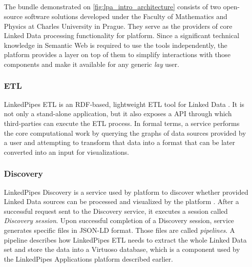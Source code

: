 \subsection{\lps{}} 
\label{ssssec:linkedpipes_services}

The \lps{} bundle demonstrated on \autoref{fig:lpa_intro_architecture} consists of two open-source software solutions developed under the Faculty of Mathematics and Physics at Charles University in Prague. They serve as the providers of core Linked Data processing functionality for \lpa{} platform. Since a significant technical knowledge in Semantic Web is required to use the tools independently, the \lpa{} platform provides a layer on top of them to simplify interactions with those components and make it available for any generic \textit{lay} user. 

\subsubsection{ETL} 

LinkedPipes ETL is an RDF-based, lightweight \gls{ETL} tool for Linked Data \cite{etl}. It is not only a stand-alone application, but it also exposes a \acrshort{API} through which third-parties can execute the ETL process. In formal terms, a service performs the core computational work by querying the graphs of data sources provided by a user and attempting to transform that data into a format that can be later converted into an input for visualizations. 

\subsubsection{Discovery} 

LinkedPipes Discovery is a service used by \lpa{} platform to discover whether provided Linked Data sources can be processed and visualized by the platform \cite{discovery}. After a successful request sent to the Discovery service, it executes a session called \textit{Discovery session}. Upon successful completion of a Discovery session,  service generates specific files in JSON-LD format. Those files are called \textit{pipelines}. A pipeline describes how LinkedPipes ETL needs to extract the whole Linked Data set and store the data into a Virtuoso database, which is a component used by the LinkedPipes Applications platform described earlier. 
